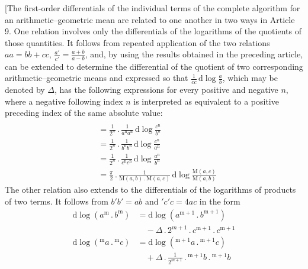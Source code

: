 \begingroup
\renewcommand{\arraystretch}{1.45}
[The first-order differentials of the individual terms of the complete algorithm for an arithmetic–geometric mean are related to one another in two ways in Article 9. One relation involves only the differentials of the logarithms of the quotients of those quantities. It follows from repeated application of the two relations $aa=bb+cc$, $\frac{a'}{c'}=\frac{a+b}{a-b}$, and, by using the results obtained in the preceding article, can be extended to determine the differential of the quotient of two corresponding arithmetic–geometric means and expressed so that $\frac{1}{cc}\,\mathrm{d}\log\frac{a}{b}$, which may be denoted by $\Delta$, has the following expressions for every positive and negative $n$, where a negative following index $n$ is interpreted as equivalent to a positive preceding index of the same absolute value:
\[
\begin{aligned}&\\&=\frac{1}{2^{n}}\mathbin{.}\frac{1}{a^{\mathrm{n}}a^{\mathrm{n}}}\,\mathrm{d}\log\frac{c^{\mathrm{n}}}{b^{\mathrm{n}}}\\&=\frac{1}{2^{n}}\mathbin{.}\frac{1}{b^{\mathrm{n}}b^{\mathrm{n}}}\,\mathrm{d}\log\frac{c^{\mathrm{n}}}{a^{\mathrm{n}}}\\&=\frac{1}{2^{n}}\mathbin{.}\frac{1}{c^{\mathrm{n}}c^{\mathrm{n}}}\,\mathrm{d}\log\frac{a^{\mathrm{n}}}{b^{\mathrm{n}}}\\&=\frac{\pi}{2}\mathbin{.}\frac{1}{\mathrm{M}(a,b)\mathbin{.}\mathrm{M}(a,c)}\,\mathrm{d}\log\frac{\mathrm{M}(a,c)}{\mathrm{M}(a,b)}\end{aligned}
\]
The other relation also extends to the differentials of the logarithms of products of two terms. It follows from $b'b'=ab$ and ${}'c{}'c=4ac$ in the form
\[
\begin{aligned}
\mathrm{d}\log(a^{\mathrm{m}}\mathbin{.} b^{\mathrm{m}})&=\mathrm{d}\log(a^{\mathrm{m}+1}\mathbin{.} b^{\mathrm{m}+1})\\&\quad-\Delta\mathbin{.}2^{m+1}\mathbin{.} c^{\mathrm{m}+1}\mathbin{.} c^{\mathrm{m}+1}\\[3pt]
\mathrm{d}\log({}^{\mathrm{m}}a\mathbin{.}{}^{\mathrm{m}}c)&=\mathrm{d}\log({}^{\mathrm{m}+1}a\mathbin{.}{}^{\mathrm{m}+1}c)\\&\quad+\Delta\mathbin{.}\frac{1}{2^{m+1}}\mathbin{.}{}^{\mathrm{m}+1}b\mathbin{.}{}^{\mathrm{m}+1}b
\end{aligned}
\]
